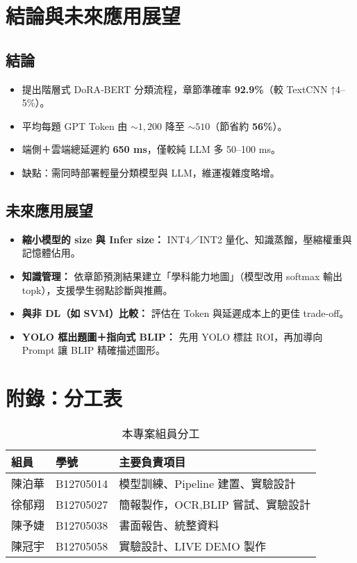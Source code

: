 \documentclass[10pt]{article}
\begin{document}
\begin{CJK}{UTF8}{bsmi}
\section{結論與未來應用展望}

\subsection{結論}
\begin{itemize}[nosep,leftmargin=1.5em]
  \item 提出階層式 DoRA‐BERT 分類流程，章節準確率 \textbf{92.9\%}（較 TextCNN ↑4–5\%）。  
  \item 平均每題 GPT Token 由 \(\sim\!1{,}200\) 降至 \(\sim\!510\)（節省約 \textbf{56\%}）。  
  \item 端側＋雲端總延遲約 \textbf{650 ms}，僅較純 LLM 多 50–100 ms。  
  \item 缺點：需同時部署輕量分類模型與 LLM，維運複雜度略增。  
\end{itemize}


\subsection{未來應用展望}
\begin{itemize}[nosep,leftmargin=1.5em]
  \item \textbf{縮小模型的 size 與 Infer size：} INT4／INT2 量化、知識蒸餾，壓縮權重與記憶體佔用。  
  \item \textbf{知識管理：} 依章節預測結果建立「學科能力地圖」（模型改用 softmax 輸出 topk），支援學生弱點診斷與推薦。  
  \item \textbf{與非 DL（如 SVM）比較：} 評估在 Token 與延遲成本上的更佳 trade-off。  
  \item \textbf{YOLO 框出題圖＋指向式 BLIP：} 先用 YOLO 標註 ROI，再加導向 Prompt 讓 BLIP 精確描述圖形。  
\end{itemize}


\appendix
\section{附錄：分工表}

\begin{table}[h]
  \centering
  \small           
  \begin{tabular}{@{}llp{7cm}@{}}  %
    \toprule
    組員 & 學號 & 主要負責項目 \\
    \midrule
    陳泊華 & B12705014 & 模型訓練、Pipeline 建置、實驗設計 \\
    徐郁翔 & B12705027 & 簡報製作，OCR,BLIP 嘗試、實驗設計 \\
    陳予婕 & B12705038 & 書面報告、統整資料 \\
    陳冠宇 & B12705058 & 實驗設計、LIVE DEMO 製作\\
    \bottomrule
  \end{tabular}
  \caption{本專案組員分工}
\end{table}


\end{CJK}
\end{document}
